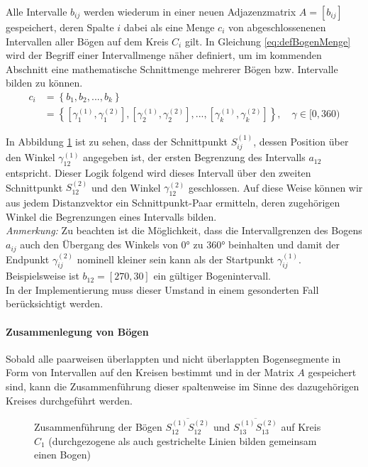 \documentclass[accentcolor=tud1c, 11pt, toc=bib, toc=listof, captions=abovetable, parskip=half]{tudreport}
\begin{document}
Alle Intervalle $b_{ij}$ werden wiederum in einer neuen Adjazenzmatrix $A = \left[ b_{ij} \right] $ gespeichert, deren Spalte $i$ dabei als eine Menge $c_i$ von abgeschlossenenen Intervallen  aller Bögen auf dem Kreis $C_i$ gilt. In Gleichung \ref{eq:defBogenMenge} wird der Begriff einer Intervallmenge näher definiert, um im kommenden Abschnitt eine mathematische Schnittmenge mehrerer Bögen bzw. Intervalle bilden zu können. \\
\begin{equation} 
\begin{aligned}
c_i &= \left\{b_1, b_2,..., b_k\right\} \\
& = \left\{\left[\gamma_1^{(1)},\gamma_1^{(2)}\right], \left[\gamma_2^{(1)},\gamma_2^{(2)}\right],..., \left[\gamma_k^{(1)},\gamma_k^{(2)}\right]\right\}, \quad \gamma \in [0,360)
\end{aligned}
\label{eq:defBogenMenge}
\end{equation}

In Abbildung \ref{fig:dreiKreise} ist zu sehen, dass der Schnittpunkt $S_{ij}^{(1)}$, dessen Position über den Winkel $\gamma_{12}^{(1)}$ angegeben ist, der ersten Begrenzung des Intervalls $a_{12}$ entspricht. Dieser Logik folgend wird dieses Intervall über den zweiten Schnittpunkt $S_{12}^{(2)}$ und den Winkel $\gamma_{12}^{(2)}$ geschlossen. Auf diese Weise können wir aus jedem Distanzvektor ein Schnittpunkt-Paar ermitteln, deren zugehörigen Winkel die Begrenzungen eines Intervalls bilden.\\

\emph{Anmerkung:} Zu beachten ist die Möglichkeit, dass die Intervallgrenzen des Bogens $a_{ij}$ auch den Übergang des Winkels von $\ang{0}$ zu $\ang{360}$ beinhalten und damit der Endpunkt $\gamma _{ij}^{(2)}$ nominell kleiner sein kann als der Startpunkt $\gamma _{ij}^{(1)}$. Beispielsweise ist $b_{12} = [270,30]$ ein gültiger Bogenintervall.\\
In der Implementierung muss dieser Umstand in einem gesonderten Fall berücksichtigt werden.

\paragraph{Zusammenlegung von Bögen}
Sobald alle paarweisen überlappten und nicht überlappten Bogensegmente in Form von Intervallen auf den Kreisen bestimmt und in der Matrix $A$ gespeichert sind, kann die Zusammenführung dieser spaltenweise im Sinne des dazugehörigen Kreises durchgeführt werden. \\
\begin{figure}[h!]
\centering

\caption{Zusammenführung der Bögen $\overline{S_{12}^{(1)}S_{12}^{(2)}}$ und $\overline{S_{13}^{(1)}S_{13}^{(2)}}$ auf Kreis $C_1$ (durchgezogene als auch gestrichelte Linien bilden gemeinsam einen Bogen)}
\label{fig:dreiKreise}
\end{figure}
\end{document}
